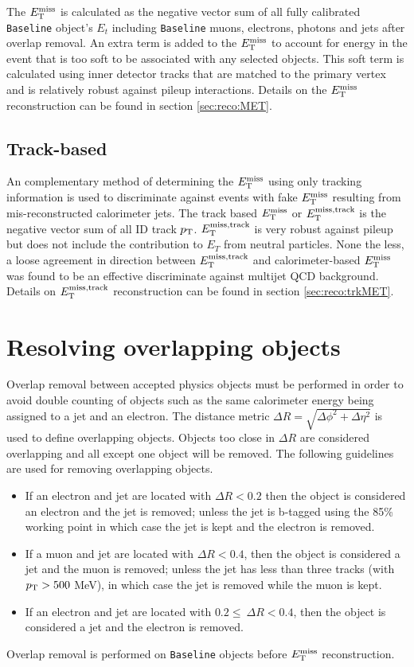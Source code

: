 \indent The $E_{\mathrm{T}}^{\mathrm{miss}}$ is calculated as the negative vector sum of all fully calibrated {\tt Baseline} object's $E_t$ including {\tt Baseline} muons, electrons, photons and jets after overlap removal.   An extra term is added to the $E_{\mathrm{T}}^{\mathrm{miss}}$ to account for energy in the event that is too soft to be associated with any selected objects. This soft term is calculated using inner detector tracks that are matched to the primary vertex and is relatively robust against pileup interactions.  Details on the $E_{\mathrm{T}}^{\mathrm{miss}}$ reconstruction can be found in section \ref{sec:reco:MET}. \\ 

\subsection{\boldmath Track-based \MET}

\indent An complementary method of determining the $E_{\mathrm{T}}^{\mathrm{miss}}$ using only tracking information is used to discriminate against events with fake $E_{\mathrm{T}}^{\mathrm{miss}}$ resulting from mis-reconstructed calorimeter jets.  The track based $E_{\mathrm{T}}^{\mathrm{miss}}$ or $E_{\mathrm{T}}^{\mathrm{miss, track}}$ is the negative vector sum of all ID track $p_{\mathrm{T}}$.  $E_{\mathrm{T}}^{\mathrm{miss, track}}$ is very robust against pileup but does not include the contribution to $E_T$ from neutral particles.  None the less, a loose agreement in direction between $E_{\mathrm{T}}^{\mathrm{miss, track}}$ and calorimeter-based $E_{\mathrm{T}}^{\mathrm{miss}}$ was found to be an effective discriminate against multijet QCD background.  Details on $E_{\mathrm{T}}^{\mathrm{miss, track}}$ reconstruction can be found in section \ref{sec:reco:trkMET}. \\

\section{Resolving overlapping objects}
\label{sec:Selection_overlap}

\indent Overlap removal between accepted physics objects must be performed in order to avoid double counting of objects such as the same calorimeter energy being assigned to a jet and an electron.  The distance metric  $\Delta R = \sqrt{\Delta \phi^2 + \Delta \eta^2}$ is used to define overlapping objects.  Objects too close in $\Delta R$ are considered overlapping and all except one object will be removed.  The following guidelines are used for removing overlapping objects. \\

\begin{itemize}
\item If an electron and jet are located with $\Delta R < 0.2$ then the object is considered an electron and  the jet is removed; unless the jet is b-tagged using the 85\% working point in which case the jet is kept and the electron is removed. 
\item If a muon and jet are located with $\Delta R < 0.4$, then the object is considered a jet and the muon is removed; unless the jet has less than three tracks (with $p_{\mathrm{T}}>500$ MeV), in which case the jet is removed while the muon is kept. 
\item If an electron and jet are located with $0.2 \leq\ \Delta R < 0.4$, then the object is considered a jet and the electron is removed.
\end{itemize}

\indent Overlap removal is performed on {\tt Baseline} objects before $E_{\mathrm{T}}^{\mathrm{miss}}$ reconstruction. \\



